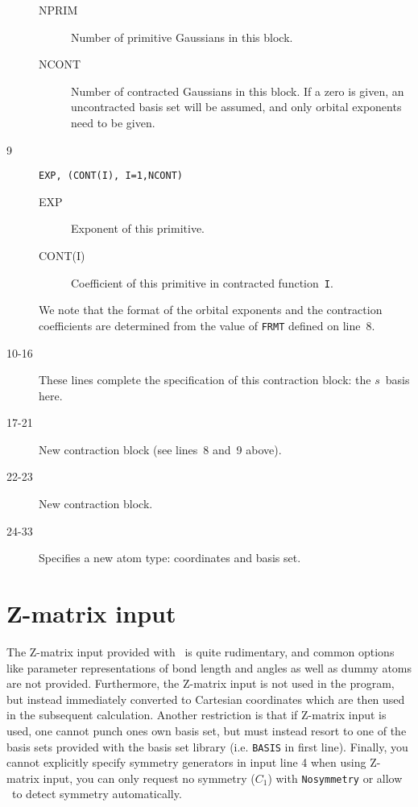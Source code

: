\begin{description}
\begin{description}
\item[NPRIM] Number of primitive
Gaussians in this block.
\item[NCONT] Number of contracted
Gaussians in this block. If a zero
is given, an uncontracted basis set will be assumed, and only orbital
exponents need to be given.
\end{description}
\item[9] \verb|EXP, (CONT(I), I=1,NCONT)|
\begin{description}
\item[EXP] Exponent of this primitive.
\item[CONT(I)] Coefficient of this primitive in contracted
function~{\tt I}.
\end{description}
We note that the format of the orbital exponents 
and the contraction
coefficients are determined from the value of {\tt FRMT} defined on
line~8.
\item[10-16] These lines complete the specification of this
contraction block: the $s$~basis here.
\item[17-21] New contraction block (see lines~8 and~9 above).
\item[22-23] New contraction block.
\item[24-33] Specifies a new atom type: coordinates and basis set.
\end{description}

\section{Z-matrix input}\label{sec:molzmat}

The Z-matrix input provided with \dalton\ is quite rudimentary, and
common options like parameter representations of bond length and
angles as well as dummy atoms are not provided. Furthermore,
the Z-matrix input is not used in the program, but instead immediately
converted to Cartesian coordinates which are then used in the
subsequent calculation.
Another restriction is that if Z-matrix input is used, one cannot
punch ones own basis set, but must instead resort to one of the basis sets
provided with the basis set library (i.e. {\tt BASIS} in first line).
Finally, you cannot explicitly specify symmetry generators in input line 4
when using Z-matrix input,
you can only request no symmetry ($C_1$) with \verb|Nosymmetry|
or allow \dalton\ to detect symmetry automatically.

